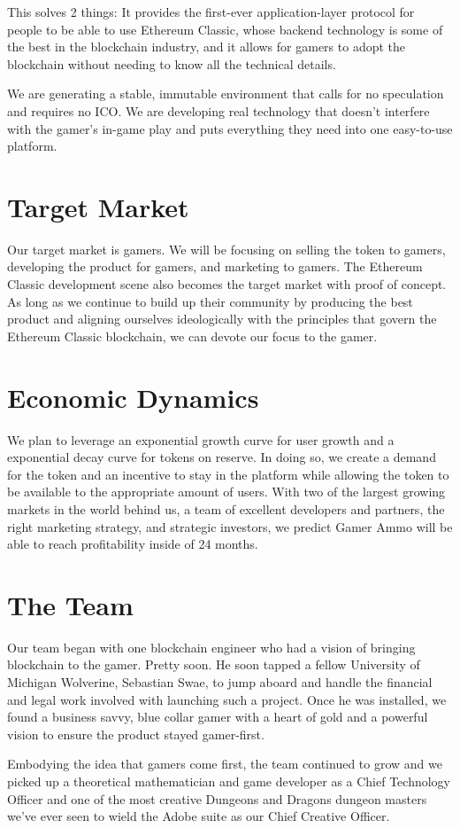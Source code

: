 \documentclass[11pt]{report}
\begin{document}
This solves 2 things: It provides the first-ever application-layer protocol for people to be able to use Ethereum Classic, whose backend technology is some of the best in the blockchain industry, and it allows for gamers to adopt the blockchain without needing to know all the technical details.

We are generating a stable, immutable environment that calls for no speculation and requires no ICO. We are developing real technology that doesn't interfere with the gamer's in-game play and puts everything they need into one easy-to-use platform.
\section{Target Market}
Our target market is gamers. We will be focusing on selling the token to gamers, developing the product for gamers, and marketing to gamers. The Ethereum Classic development scene also becomes the target market with proof of concept. As long as we continue to build up their community by producing the best product and aligning ourselves ideologically with the principles that govern the Ethereum Classic blockchain, we can devote our focus to the gamer.
\section{Economic Dynamics}
We plan to leverage an exponential growth curve for user growth and a exponential decay curve for tokens on reserve. In doing so, we create a demand for the token and an incentive to stay in the platform while allowing the token to be available to the appropriate amount of users. With two of the largest growing markets in the world behind us, a team of excellent developers and partners, the right marketing strategy, and strategic investors, we predict Gamer Ammo will be able to reach profitability inside of 24 months.
\section{The Team}
Our team began with one blockchain engineer who had a vision of bringing blockchain to the gamer. Pretty soon. He soon tapped a fellow University of Michigan Wolverine, Sebastian Swae, to jump aboard and handle the financial and legal work involved with launching such a project. Once he was installed, we found a business savvy, blue collar gamer with a heart of gold and a powerful vision to ensure the product stayed gamer-first.

Embodying the idea that gamers come first, the team continued to grow and we picked up a theoretical mathematician and game developer as a Chief Technology Officer and one of the most creative Dungeons and Dragons dungeon masters we've ever seen to wield the Adobe suite as our Chief Creative Officer.
\end{document}
